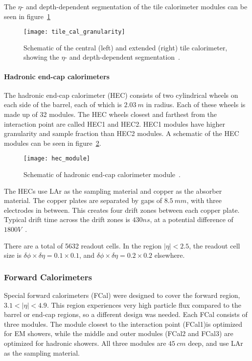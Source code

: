 The $\eta$- and depth-dependent segmentation of the tile calorimeter modules can be seen in figure~\ref{fig:tile_cal_granularity}

\begin{figure}[!ht]\centering
\texttt{[image: tile\_cal\_granularity]}
\caption{Schematic of the central (left) and extended (right) tile calorimeter, showing the $\eta$- and depth-dependent segmentation~\cite{atlas-detector-2008}.}
\label{fig:tile_cal_granularity}
\end{figure}

\paragraph{Hadronic end-cap calorimeters}

The hadronic end-cap calorimeter (HEC) consists of two cylindrical wheels on each side of the barrel,
each of which is $2.03~m$ in radius.
Each of these wheels is made up of 32 modules.
The HEC wheels closest and farthest from the interaction point are called HEC1 and HEC2.
HEC1 modules have higher granularity and sample fraction than HEC2 modules.
A schematic of the HEC modules can be seen in figure~\ref{fig:hec_module}.

\begin{figure}[!ht]\centering
\texttt{[image: hec\_module]}
\caption{Schematic of hadronic end-cap calorimeter module~\cite{atlas-detector-2008}.}
\label{fig:hec_module}
\end{figure}

The HECs use LAr as the sampling material and copper as the absorber material.
The copper plates are separated by gaps of $8.5~mm$, with three electrodes in between.
This creates four drift zones between each copper plate.
Typical drift time across the drift zones is $430 ns$, at a potential difference of $1800 V$~\cite{atlas-detector-2008}.

There are a total of 5632 readout cells.
In the region $|\eta| < 2.5$, the readout cell size is $\delta\phi \times \delta\eta = 0.1 \times 0.1$, and $\delta\phi \times \delta\eta = 0.2 \times 0.2$ elsewhere.

\subsubsection{Forward Calorimeters}\label{subsubsec:fcal}

Special forward calorimeters (FCal) were designed to cover the forward region, $3.1 < |\eta| < 4.9$.
This region experiences very high particle flux compared to the barrel or end-cap regions, so a different design was needed.
Each FCal consists of three modules.
The module closest to the interaction point (FCal1)is optimized for EM showers,
while the middle and outer modules (FCal2 and FCal3) are optimized for hadronic showers.
All three modules are $45~cm$ deep, and use LAr as the sampling material.

